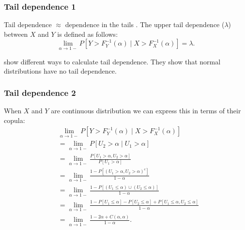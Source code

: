 \documentclass[18pt,aspectratio=149]{beamer}
\begin{document}
\begin{frame}
    \frametitle{Tail dependence 1}
    Tail dependence $\approx$ dependence in the tails .
    The upper tail dependence ($\lambda$) between $X$ and $Y$ is defined as follows:
    \begin{equation}
        \lim_{\alpha \to 1-}  P[ Y > F_{Y}^{-1} ( \alpha)
                \mid X > F_{X}^{-1} ( \alpha) ]=\lambda.
    \end{equation}
    \pause

    \cite{dempster_correlation_2002} show different ways to calculate tail dependence. They show
    that normal distributions have no tail dependence.
\end{frame}

\begin{frame}
    \frametitle{Tail dependence 2}
    When $X$ and $Y$ are continuous distribution we can express this in terms
    of their copula:
    \vspace{-0.5cm}
    {\small
        \begin{align}
             & \lim_{\alpha \to 1-}  P[ Y > F_{Y}^{-1} ( \alpha) \mid X > F_{X}^{-1} ( \alpha) ]                                          \\
             & =\lim_{\alpha \to 1-}  P[ U_{2} >  \alpha \mid U_{1} >  \alpha ]                                                           \\
             & =\lim_{\alpha \to 1-}  \frac{P[U_{1}>\alpha,U_{2}>\alpha]}{P[U_{1}>\alpha]}                                                \\
             & =\lim_{\alpha \to 1-}  \frac{1 - P[(U_{1}>\alpha,U_{2}>\alpha)^{c}]}{1-\alpha}                                             \\
             & =\lim_{\alpha \to 1-}  \frac{1 - P[(U_{1}\le \alpha) \cup ( U_{2}\le\alpha)]}{1-\alpha}                                    \\
             & =\lim_{\alpha \to 1-}  \frac{1 - P[U_{1}\le \alpha] - P[U_{2}\le \alpha]  + P[U_{1}\le \alpha , U_{2}\le\alpha]}{1-\alpha} \\
             & =\lim_{\alpha\to1-} \frac{1-2 \alpha +C(\alpha,\alpha)} {1-\alpha}.
        \end{align}
    }

\end{frame}
\end{document}
